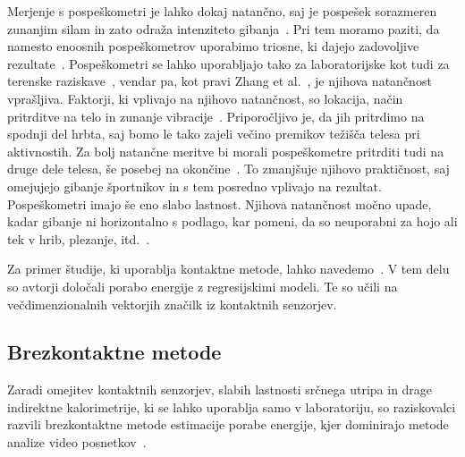 Merjenje s pospeškometri je lahko dokaj natančno, saj je pospešek sorazmeren zunanjim silam in zato odraža intenziteto gibanja~\cite{yang2010review}. Pri tem moramo paziti, da namesto enoosnih pospeškometrov uporabimo triosne, ki dajejo zadovoljive rezultate~\cite{levine2005measurement}. Pospeškometri se lahko uporabljajo tako za laboratorijske kot tudi za terenske raziskave~\cite{yang2014sleep}, vendar pa, kot pravi Zhang et al.~\cite{zhang2004improving}, je njihova natančnost vprašljiva. Faktorji, ki vplivajo na njihovo natančnost, so lokacija, način pritrditve na telo in zunanje vibracije~\cite{yang2010review}. Priporočljivo je, da jih pritrdimo na spodnji del hrbta, saj bomo le tako zajeli večino premikov težišča telesa pri aktivnostih. Za bolj natančne meritve bi morali pospeškometre pritrditi tudi na druge dele telesa, še posebej na okončine~\cite{yang2010review}. To zmanjšuje njihovo praktičnost, saj omejujejo gibanje športnikov in s tem posredno vplivajo na rezultat. Pospeškometri imajo še eno slabo lastnost. Njihova natančnost močno upade, kadar gibanje ni horizontalno s podlago, kar pomeni, da so neuporabni za hojo ali tek v hrib, plezanje, itd.~\cite{yang2010review}.

Za primer študije, ki uporablja kontaktne metode, lahko navedemo~\cite{gjoreski2015context}. V tem delu so avtorji določali porabo energije z regresijskimi modeli. Te so učili na večdimenzionalnih vektorjih značilk iz kontaktnih senzorjev.





\subsection{Brezkontaktne metode}

Zaradi omejitev kontaktnih senzorjev, slabih lastnosti srčnega utripa in drage indirektne kalorimetrije, ki se lahko uporablja samo v laboratoriju, so raziskovalci razvili brezkontaktne metode estimacije porabe energije, kjer dominirajo metode analize video posnetkov~\cite{botton2011energy,osgnach2010energy,silva2015assessing,peker2004framework,nathan2015estimating}. 
